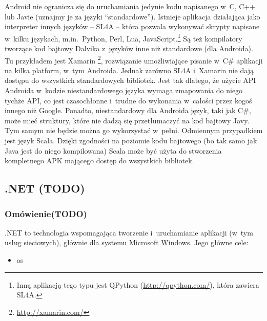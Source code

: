 Android nie ogranicza się do uruchamiania jedynie kodu napisanego w~C, C++ lub Javie (uznajmy je za języki ``standardowe''). Istnieje aplikacja działająca jako interpreter innych języków -- SL4A\cite{androidsl4a} -- która pozwala wykonywać skrypty napisane w~kilku językach, m.in.\ Python, Perl, Lua, JavaScript.\footnote{Inną aplikacją tego typu jest QPython (\url{http://qpython.com/}), która zawiera SL4A.}
Są też kompilatory tworzące kod bajtowy Dalvika z~języków inne niż standardowe (dla Androida). Tu przykładem jest Xamarin \footnote{\url{http://xamarin.com/}}, rozwiązanie umożliwiające pisanie w~C\# aplikacji na kilka platform, w~tym Androida.
Jednak zarówno SL4A i~Xamarin nie dają dostępu do wszystkich standardowych bibliotek. Jest tak dlatego, że użycie API Androida w~kodzie niestandardowego języka wymaga zmapowania do niego tychże API, co jest czasochłonne i~trudne do wykonania w~całości przez kogoś innego niż Google. Ponadto, niestandardowy dla Androida język, taki jak C\#, może mieć struktury, które nie dadzą się przetłumaczyć na kod bajtowy Javy. Tym samym nie będzie można go wykorzystać w~pełni. Odmiennym przypadkiem jest język Scala. Dzięki zgodności na poziomie kodu bajtowego (bo tak samo jak Java jest do niego kompilowana) Scala może być użyta do stworzenia kompletnego APK mającego dostęp do wszystkich bibliotek.


\subsection{.NET (TODO)}
\subsubsection{Omówienie(TODO)}
.NET to technologia wspomagająca tworzenie i~uruchamianie aplikacji (w~tym usług sieciowych), głównie dla systemu Microsoft Windows\cite{dotnetoverview}. Jego główne cele:
\begin{itemize}
	\item as
\end{itemize}

